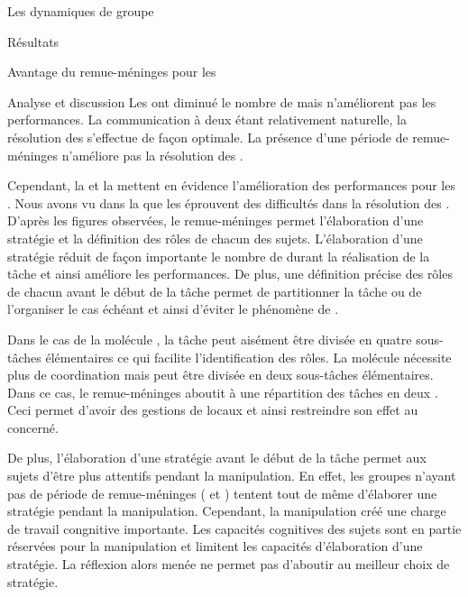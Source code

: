 \documentclass[myfrancais]{mythesis}
\begin{document}
\begin{mychapter}{Les dynamiques de groupe}
\begin{mysection}{Résultats}
\begin{mysubsection}{Avantage du remue-méninges pour les }
\begin{mysubsubsection}{Analyse et discussion}
					Les  ont diminué le nombre de  mais n'améliorent pas les performances.
					La communication à deux étant relativement naturelle, la résolution des  s'effectue de façon optimale.
					La présence d'une période de remue-méninges n'améliore pas la résolution des .

					Cependant, la  et la  mettent en évidence l'amélioration des performances pour les .
					Nous avons vu dans la  que les  éprouvent des difficultés dans la résolution des .
					D'après les figures observées, le remue-méninges permet l'élaboration d'une stratégie et la définition des rôles de chacun des sujets.
					L'élaboration d'une stratégie réduit de façon importante le nombre de  durant la réalisation de la tâche et ainsi améliore les performances.
					De plus, une définition précise des rôles de chacun avant le début de la tâche permet de partitionner la tâche ou de l'organiser le cas échéant et ainsi d'éviter le phénomène de .

					Dans le cas de la molécule \myPrion, la tâche peut aisément être divisée en quatre sous-tâches élémentaires ce qui facilite l'identification des rôles.
					La molécule \myUbiquitin nécessite plus de coordination mais peut être divisée en deux sous-tâches élémentaires.
					Dans ce cas, le remue-méninges aboutit à une répartition des tâches en deux .
					Ceci permet d'avoir des gestions de  locaux et ainsi restreindre son effet au  concerné.

					De plus, l'élaboration d'une stratégie avant le début de la tâche permet aux sujets d'être plus attentifs pendant la manipulation.
					En effet, les groupes n'ayant pas de période de remue-méninges ( et ) tentent tout de même d'élaborer une stratégie pendant la manipulation.
					Cependant, la manipulation créé une charge de travail congnitive importante.
					Les capacités cognitives des sujets sont en partie réservées pour la manipulation et limitent les capacités d'élaboration d'une stratégie.
					La réflexion alors menée ne permet pas d'aboutir au meilleur choix de stratégie.


\end{mysubsubsection}
\end{mysubsection}
\end{mysection}
\end{mychapter}
\end{document}
